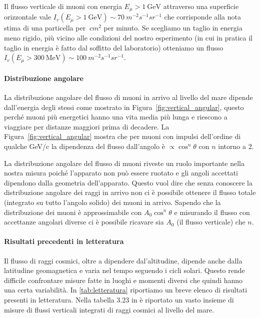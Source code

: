 Il flusso verticale di muoni con energia $E_{\mu} > \SI{1}{\GeV}$ attraverso una superficie orizzontale vale $I_v(E_{\mu} > \SI{1}{\GeV}) \sim \SI{70}{m^{-2} s^{-1} sr^{-1}}$ che corrisponde alla nota stima di una particella per $\SI{}{cm^2}$ per minuto. Se scegliamo un taglio in energia meno rigido, più vicino alle condizioni del nostro esperimento (in cui in pratica il taglio in energia è fatto dal soffitto del laboratorio) otteniamo un flusso $I_v(E_{\mu} > \SI{300}{\MeV}) \sim \SI{100}{m^{-2} s^{-1} sr^{-1}}$.

\paragraph{Distribuzione angolare}

La distribuzione angolare del flusso di muoni in arrivo al livello del mare dipende dall'energia degli stessi come mostrato in Figura~\ref{fig:vertical_angular}, questo perché muoni più energetici hanno una vita media più lunga e riescono a viaggiare per distanze maggiori prima di decadere.
La Figura~\ref{fig:vertical_angular} mostra che per muoni con impulsi dell'ordine di qualche GeV/c la dipendenza del flusso dall'angolo è $\propto \cos^n\theta$ con $n$ intorno a 2.

La distribuzione angolare del flusso di muoni riveste un ruolo importante nella nostra misura poiché l'apparato non può essere ruotato e gli angoli accettati dipendono dalla geometria dell'apparato. Questo vuol dire che senza conoscere la distribuzione angolare dei raggi in arrivo non ci è possibile ottenere il flusso totale (integrato su tutto l'angolo solido) dei muoni in arrivo. Sapendo che la distribuzione dei muoni è approssimabile con $A_0 \cos^n\theta$ e misurando il flusso con accettanze angolari diverse ci è possibile ricavare sia $A_0$ (il flusso verticale) che $n$.

\paragraph{Risultati precedenti in letteratura}

Il flusso di raggi cosmici, oltre a dipendere dal'altitudine, dipende anche dalla latitudine geomagnetica e varia nel tempo seguendo i cicli solari. Questo rende difficile confrontare misure fatte in luoghi e momenti diversi che quindi hanno una certa variabilità.
In \autoref{tab:letteratura} riportiamo un breve elenco di risultati presenti in letteratura. Nella tabella 3.23 in \cite{7}  è riportato un vasto insieme di misure di flussi verticali integrati di raggi cosmici al livello del mare.


